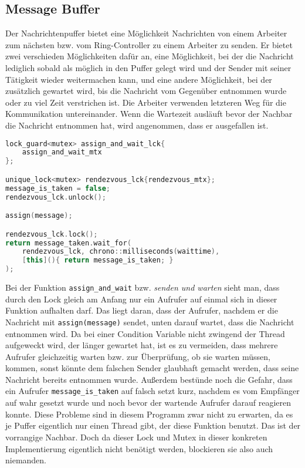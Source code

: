 \subsection{Message Buffer}

Der Nachrichtenpuffer bietet eine Möglichkeit Nachrichten von einem Arbeiter zum nächsten bzw. vom Ring-Controller zu einem Arbeiter zu senden.
Er bietet zwei verschieden Möglichkeiten dafür an, eine Möglichkeit, bei der die Nachricht lediglich sobald als möglich in den Puffer gelegt wird und 
der Sender mit seiner Tätigkeit wieder weitermachen kann, und eine andere Möglichkeit, bei der zusätzlich gewartet wird, bis die Nachricht vom Gegenüber 
entnommen wurde oder zu viel Zeit verstrichen ist. Die Arbeiter verwenden letzteren Weg für die Kommunikation untereinander. Wenn die Wartezeit ausläuft
bevor der Nachbar die Nachricht entnommen hat, wird angenommen, dass er ausgefallen ist.

\noindent\hrulefill\par
\begin{minipage}{\linewidth}
\begin{lstlisting}[mathescape, language=C++, caption=senden und warten]
lock_guard<mutex> assign_and_wait_lck{
    assign_and_wait_mtx
};

unique_lock<mutex> rendezvous_lck{rendezvous_mtx}; 
message_is_taken = false;
rendezvous_lck.unlock();

assign(message);

rendezvous_lck.lock();
return message_taken.wait_for(
    rendezvous_lck, chrono::milliseconds(waittime), 
    [this](){ return message_is_taken; }
);
\end{lstlisting}
\end{minipage}
$$$$
Bei der Funktion \verb|assign_and_wait| bzw. \textit{senden und warten} sieht man, dass durch den Lock gleich am Anfang nur ein Aufrufer auf einmal
sich in dieser Funktion aufhalten darf. Das liegt daran, dass der Aufrufer, nachdem er die Nachricht mit \verb|assign(message)| sendet, unten darauf
wartet, dass die Nachricht entnommen wird. Da bei einer Condition Variable nicht zwingend der Thread aufgeweckt wird, der länger gewartet hat, ist es
zu vermeiden, dass mehrere Aufrufer gleichzeitig warten bzw. zur Überprüfung, ob sie warten müssen, kommen, sonst könnte dem falschen Sender glaubhaft
gemacht werden, dass seine Nachricht bereits entnommen wurde. Außerdem bestünde noch die Gefahr, dass ein Aufrufer \verb|message_is_taken| auf falsch
setzt kurz, nachdem es vom Empfänger auf wahr gesetzt wurde und noch bevor der wartende Aufrufer darauf reagieren konnte. Diese Probleme sind 
in diesem Programm zwar nicht zu erwarten, da es je Puffer eigentlich nur einen Thread gibt, der diese Funktion benutzt. Das ist der vorrangige Nachbar.
Doch da dieser Lock und Mutex in dieser konkreten Implementierung eigentlich nicht benötigt werden, blockieren sie also auch niemanden.

